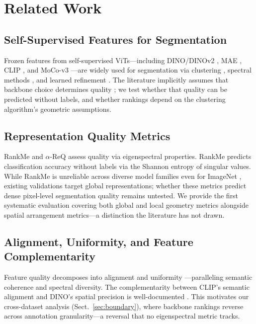 \documentclass[runningheads]{llncs}
\begin{document}
\section{Related Work}

\subsection{Self-Supervised Features for Segmentation}
Frozen features from self-supervised ViTs---including DINO/DINOv2 \cite{caron2021,oquab2024}, MAE \cite{he2022}, CLIP \cite{radford2021}, and MoCo-v3 \cite{chen2021mocov3}---are widely used for segmentation via clustering \cite{wang2023lightweight,amir2022}, spectral methods \cite{melas2022,kim2024eagle,couairon2024diffcut}, and learned refinement \cite{hamilton2022,curie2025}. The literature implicitly assumes that backbone choice determines quality \cite{amir2022}; we test whether that quality can be predicted without labels, and whether rankings depend on the clustering algorithm's geometric assumptions.

\subsection{Representation Quality Metrics}
RankMe \cite{garrido2023} and $\alpha$-ReQ \cite{agrawal2022} assess quality via eigenspectral properties. RankMe predicts classification accuracy without labels via the Shannon entropy of singular values. While RankMe is unreliable across diverse model families even for ImageNet \cite{tsitsulin2023}, existing validations target global representations; whether these metrics predict dense pixel-level segmentation quality \cite{ijcv2025ssl} remains untested. We provide the first systematic evaluation covering both global and local geometry metrics alongside spatial arrangement metrics---a distinction the literature has not drawn.

\subsection{Alignment, Uniformity, and Feature Complementarity}
Feature quality decomposes into alignment and uniformity \cite{wang2020alignment,bardes2022vicreg}---paralleling semantic coherence and spectral diversity. The complementarity between CLIP's semantic alignment and DINO's spatial precision is well-documented \cite{tong2024eyes,wysoczanska2024clipdinoiser}. This motivates our cross-dataset analysis (Sect.~\ref{sec:boundary}), where backbone rankings reverse across annotation granularity---a reversal that no eigenspectral metric tracks.
\end{document}

